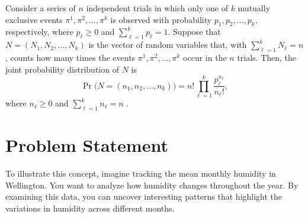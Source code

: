 Consider a series of $n$ independent trials in which only one of $k$ mutually exclusive events ${\pi}^1, {\pi}^2,\dots, {\pi}^k$ is observed with probability $p_1, p_2, \dots, p_k,$ respectively, where $p_\ell \geq 0$ and $\sum_{\ell=1}^{k} p_\ell=1$. 
Suppose that $N=(N_1, N_2, \dots, N_k)$ is the vector of random variables that, with $\sum_{\ell=1}^{k} N_\ell=n$, counts how many times the events ${\pi}^1, {\pi}^2,\dots, {\pi}^k$ occur in the $n$ trials. Then, the joint probability distribution of $N$ is
\begin{equation}
	\Pr\big(N=(n_1,n_2,\dots, n_k)\big) = n! \prod_{\ell=1}^{k} \frac{p_\ell^{n_\ell}}{n_\ell !}, %
\end{equation}    
where $n_\ell \geq 0$ and $\sum_{\ell=1}^{k} n_\ell=n$ .


\section*{Problem Statement}


To illustrate this concept, imagine tracking the mean monthly humidity in Wellington. You want to analyze how humidity changes throughout the year. By examining this data, you can uncover interesting patterns that highlight the variations in humidity across different months. 



